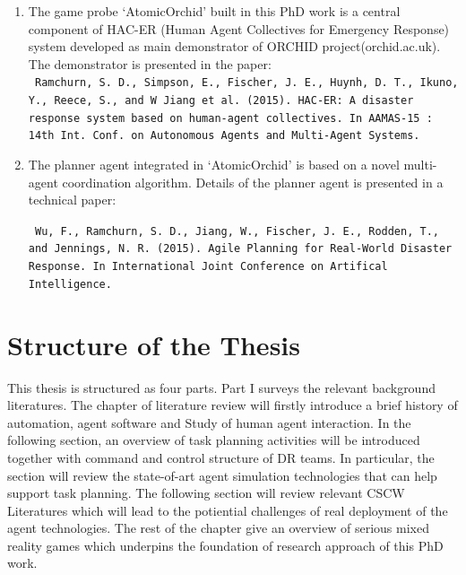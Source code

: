 \begin{enumerate}
\item The game probe `AtomicOrchid' built in this PhD work is a central component of HAC-ER (Human Agent Collectives for Emergency Response) system  developed as main demonstrator of ORCHID project(orchid.ac.uk). The demonstrator is presented in the paper:\\

\texttt{  Ramchurn, S. D., Simpson, E., Fischer, J. E., Huynh, D. T., Ikuno, Y., Reece, S., and  W Jiang et al. (2015). HAC-ER: A disaster response system based on human-agent collectives. In AAMAS-15 : 14th Int. Conf. on Autonomous Agents and Multi-Agent Systems.} \\ 


\item The planner agent integrated in `AtomicOrchid' is based on a novel multi-agent coordination algorithm. Details of the planner agent is presented in a technical paper: 

\texttt{ Wu, F., Ramchurn, S. D., Jiang, W., Fischer, J. E., Rodden, T., and Jennings, N. R. (2015). Agile Planning for Real-World Disaster Response. In International Joint Conference on Artifical Intelligence.}


\end{enumerate} 














\section{Structure of the Thesis}
This thesis is structured as four parts. Part I surveys the relevant background literatures. The chapter of literature review will firstly introduce a brief history of automation, agent software and Study of human agent interaction. In the following section, an overview of task planning activities will be introduced together with command and control structure of DR teams. In particular, the section will review the state-of-art agent simulation technologies that can help support task planning. The following section will review relevant CSCW Literatures which will lead to the potiential challenges of real deployment of the agent technologies. The rest of the chapter give an overview of serious mixed reality games which underpins the foundation of research approach of this PhD work.\\

